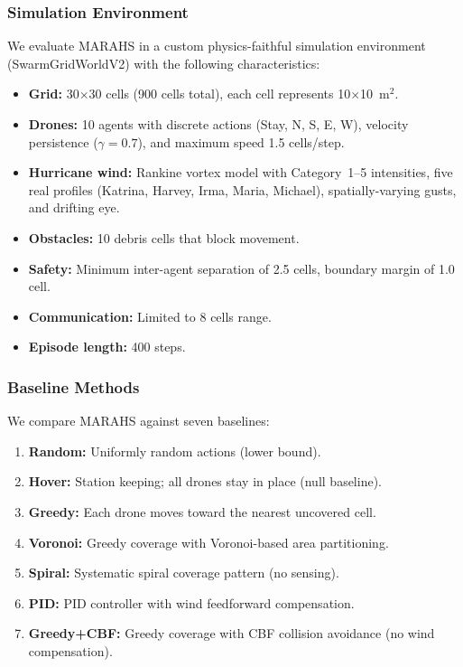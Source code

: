 \documentclass[12pt,a4paper,twocolumn]{article}
\begin{document}
\subsubsection{Simulation Environment}
We evaluate MARAHS in a custom physics-faithful simulation environment (SwarmGridWorldV2) with the following characteristics:
\begin{itemize}[leftmargin=*]
    \item \textbf{Grid:} 30$\times$30 cells (900 cells total), each cell represents 10$\times$10~m$^2$.
    \item \textbf{Drones:} 10 agents with discrete actions (Stay, N, S, E, W), velocity persistence ($\gamma = 0.7$), and maximum speed 1.5 cells/step.
    \item \textbf{Hurricane wind:} Rankine vortex model with Category~1--5 intensities, five real profiles (Katrina, Harvey, Irma, Maria, Michael), spatially-varying gusts, and drifting eye.
    \item \textbf{Obstacles:} 10 debris cells that block movement.
    \item \textbf{Safety:} Minimum inter-agent separation of 2.5 cells, boundary margin of 1.0 cell.
    \item \textbf{Communication:} Limited to 8 cells range.
    \item \textbf{Episode length:} 400 steps.
\end{itemize}

\subsubsection{Baseline Methods}
We compare MARAHS against seven baselines:
\begin{enumerate}[leftmargin=*, label=\textbf{B\arabic*}]
    \item \textbf{Random:} Uniformly random actions (lower bound).
    \item \textbf{Hover:} Station keeping; all drones stay in place (null baseline).
    \item \textbf{Greedy:} Each drone moves toward the nearest uncovered cell.
    \item \textbf{Voronoi:} Greedy coverage with Voronoi-based area partitioning.
    \item \textbf{Spiral:} Systematic spiral coverage pattern (no sensing).
    \item \textbf{PID:} PID controller with wind feedforward compensation.
    \item \textbf{Greedy+CBF:} Greedy coverage with CBF collision avoidance (no wind compensation).
\end{enumerate}
\end{document}

